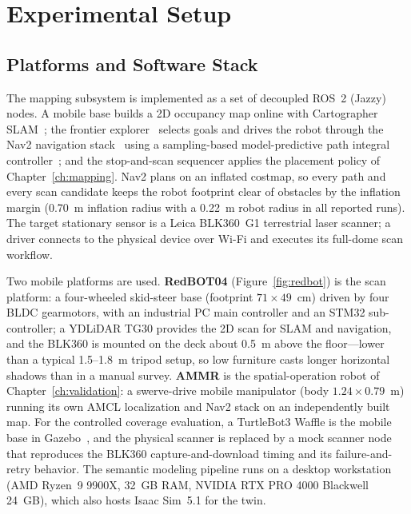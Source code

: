 \section{Experimental Setup}
\label{sec:setup}

\subsection{Platforms and Software Stack}
\label{subsec:platforms}

The mapping subsystem is implemented as a set of decoupled ROS~2 (Jazzy) nodes.
A mobile base builds a 2D occupancy map online with Cartographer
SLAM~\cite{hess2016}; the frontier explorer~\cite{guler2024} selects goals and
drives the robot through the Nav2 navigation stack~\cite{macenski2020marathon}
using a sampling-based model-predictive path integral
controller~\cite{williams2016}; and the stop-and-scan sequencer applies the
placement policy of Chapter~\ref{ch:mapping}. Nav2 plans on an inflated
costmap, so every path and every scan candidate keeps the robot footprint clear
of obstacles by the inflation margin (0.70~m inflation radius with a 0.22~m
robot radius in all reported runs). The target stationary sensor is a Leica
BLK360~G1 terrestrial laser scanner; a driver connects to the physical device
over Wi-Fi and executes its full-dome scan workflow.

Two mobile platforms are used. \textbf{RedBOT04} (Figure~\ref{fig:redbot}) is
the scan platform: a four-wheeled skid-steer base (footprint $71\times49$~cm)
driven by four BLDC gearmotors, with an industrial PC main controller and an
STM32 sub-controller; a YDLiDAR TG30 provides the 2D scan for SLAM and
navigation, and the BLK360 is mounted on the deck about 0.5~m above the
floor---lower than a typical 1.5--1.8~m tripod setup, so low furniture casts
longer horizontal shadows than in a manual survey. \textbf{AMMR} is the
spatial-operation robot of Chapter~\ref{ch:validation}: a swerve-drive mobile
manipulator (body $1.24\times0.79$~m) running its own AMCL localization and
Nav2 stack on an independently built map. For the controlled coverage
evaluation, a TurtleBot3 Waffle is the mobile base in
Gazebo~\cite{koenig2004gazebo}, and the physical scanner is replaced by a mock
scanner node that reproduces the BLK360 capture-and-download timing and its
failure-and-retry behavior. The semantic modeling pipeline runs on a desktop
workstation (AMD Ryzen~9 9900X, 32~GB RAM, NVIDIA RTX PRO 4000 Blackwell
24~GB), which also hosts Isaac Sim~5.1 for the twin.


